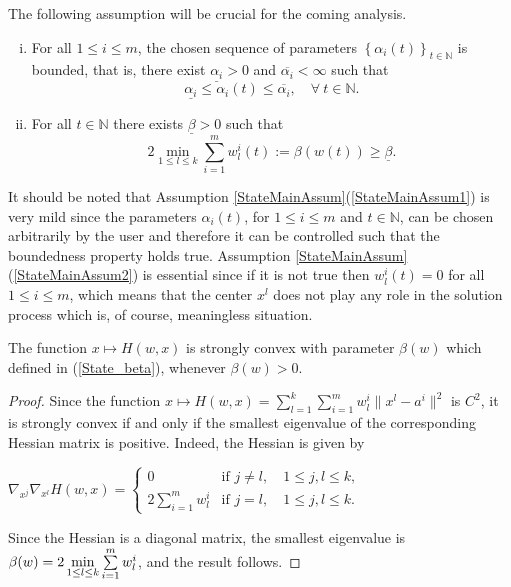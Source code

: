 The following assumption will be crucial for the coming analysis.
\begin{assumption}\label{StateMainAssum}
\begin{enumerate}[(i)] 
	\item For all $1 \leq i \leq m$, the chosen sequence of parameters $\left\lbrace \alpha_i(t) \right\rbrace_{t \in \mathbb{N}}$ is bounded, that is, there exist $\underline{\alpha_i} > 0$ and $\overline{\alpha_i} < \infty$ such that
		\begin{equation}
			\underline{\alpha_i} \leq \alpha_i(t) \leq \overline{\alpha_i}, \quad \forall \: t \in \mathbb{N}.
		\end{equation}		 \label{StateMainAssum1}
	\item For all $t \in \mathbb{N}$ there exists $\underline{\beta} > 0$ such that
		\begin{equation}
			2 \min\limits_{1 \leq l \leq k} \sum\limits_{i=1}^{m} w^i_l(t) := \beta(w(t)) \geq \underline{\beta}. \label{State_beta}
		\end{equation}		 \label{StateMainAssum2}
\end{enumerate}
\end{assumption}
It should be noted that Assumption \ref{StateMainAssum}(\ref{StateMainAssum1}) is very mild since the parameters $\alpha_i(t)$, for $1 \leq i \leq m$ and $t \in \mathbb{N}$, can be chosen arbitrarily by the user and therefore it can be controlled such that the boundedness property holds true. Assumption \ref{StateMainAssum}(\ref{StateMainAssum2}) is essential since if it is not true then $w^i_l(t)=0$ for all $1 \leq i \leq m$, which means that the center $x^l$ does not play any role in the solution process which is, of course, meaningless situation.

\begin{lemma} \label{StateEq14}
The function $x \mapsto H(w,x)$ is strongly convex with parameter $\beta(w)$ which defined in (\ref{State_beta}), whenever $\beta(w) > 0$.
\end{lemma}

\begin{proof}
Since the function $x \mapsto H(w,x) = 
\sum\limits_{l=1}^{k} \sum\limits_{i=1}^{m} w^i_l \|x^l - a^i\|^2$ is $C^2$, it is strongly convex if and only if the smallest eigenvalue of the corresponding Hessian matrix is positive. Indeed, the Hessian is given by

\begin{center}
$\nabla_{x^j} \nabla_{x^l} H(w,x) = 
\begin{cases} 0 &\mbox{if } j \neq l, \quad 1 \leq j,l \leq k ,
\\ 2\sum\limits_{i=1}^{m} w^i_l &\mbox{if } j = l, \quad 1 \leq j,l \leq k. \end{cases} $
\end{center}

Since the Hessian is a diagonal matrix, the smallest eigenvalue is $\beta(w) = \\ 2\min\limits_{1 \leq l \leq k} \sum\limits_{i=1}^{m} w^i_l$, and the result follows.
\end{proof}

